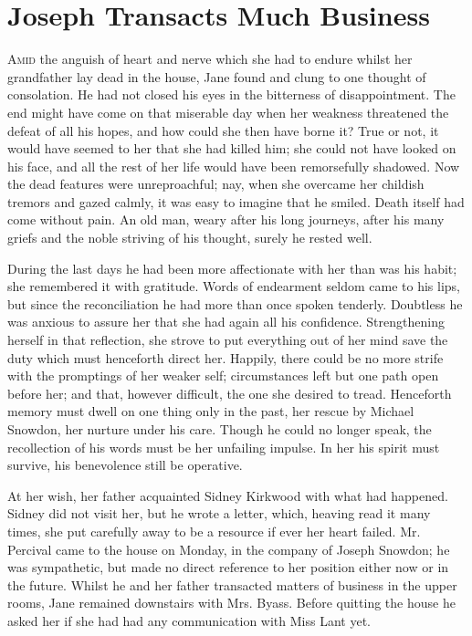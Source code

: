 \chapter{Joseph Transacts Much Business}

\textsc{Amid} the anguish of heart and nerve which she had to endure
whilst her grandfather lay dead in the house, Jane found and clung to
one thought of consolation. He had not closed his eyes in the bitterness
of disappointment. The end might have come on that miserable day when
her weakness threatened the defeat of all his hopes, and how could she
then have borne it? True or not, it would have seemed to her that she
had killed him; she could not have looked on his face, and all the rest
of her life would have been remorsefully shadowed. Now the dead features
were unreproachful; nay, when she overcame her childish tremors and
gazed calmly, it was easy to imagine that he smiled. Death itself had
come without pain. An old man, weary after his long journeys, {}after
his many griefs and the noble striving of his thought, surely he rested
well.

During the last days he had been more affectionate with her than was his
habit; she remembered it with gratitude. Words of endearment seldom came
to his lips, but since the reconciliation he had more than once spoken
tenderly. Doubtless he was anxious to assure her that she had again all
his confidence. Strengthening herself in that reflection, she strove to
put everything out of her mind save the duty which must henceforth
direct her. Happily, there could be no more strife with the promptings
of her weaker self; circumstances left but one path open before her; and
that, however difficult, the one she desired to tread. Henceforth memory
must dwell on one thing only in the past, her rescue by Michael Snowdon,
her nurture under his care. Though he could no longer speak, the
recollection of his words must be her unfailing impulse. In her his
spirit must survive, his benevolence still be operative.

At her wish, her father acquainted Sidney Kirkwood with what had
happened. Sidney did not visit her, but he wrote a letter, which,
{}heaving read it many times, she put carefully away to be a resource if
ever her heart failed. Mr. Percival came to the house on Monday, in the
company of Joseph Snowdon; he was sympathetic, but made no direct
reference to her position either now or in the future. Whilst he and her
father transacted matters of business in the upper rooms, Jane remained
downstairs with Mrs. Byass. Before quitting the house he asked her if
she had had any communication with Miss Lant yet.

